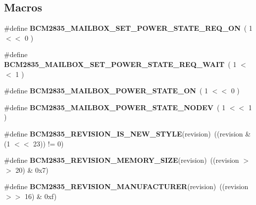 \subsection*{Macros}
\begin{DoxyCompactItemize}
\item 
\mbox{\label{group__raspberrypi__vc_ga726156a9056972f86bca2c0b709adf99}} 
\#define {\bfseries B\+C\+M2835\+\_\+\+M\+A\+I\+L\+B\+O\+X\+\_\+\+S\+E\+T\+\_\+\+P\+O\+W\+E\+R\+\_\+\+S\+T\+A\+T\+E\+\_\+\+R\+E\+Q\+\_\+\+ON}~( 1 $<$$<$ 0 )
\item 
\mbox{\label{group__raspberrypi__vc_ga9bc020dbaf9fcde6c191cfa50e85f363}} 
\#define {\bfseries B\+C\+M2835\+\_\+\+M\+A\+I\+L\+B\+O\+X\+\_\+\+S\+E\+T\+\_\+\+P\+O\+W\+E\+R\+\_\+\+S\+T\+A\+T\+E\+\_\+\+R\+E\+Q\+\_\+\+W\+A\+IT}~( 1 $<$$<$ 1 )
\item 
\mbox{\label{group__raspberrypi__vc_ga735623bc9ac7e9974fc88d27d602d33a}} 
\#define {\bfseries B\+C\+M2835\+\_\+\+M\+A\+I\+L\+B\+O\+X\+\_\+\+P\+O\+W\+E\+R\+\_\+\+S\+T\+A\+T\+E\+\_\+\+ON}~( 1 $<$$<$ 0 )
\item 
\mbox{\label{group__raspberrypi__vc_ga505cdb968bbf285e552bb575a5eeeaa5}} 
\#define {\bfseries B\+C\+M2835\+\_\+\+M\+A\+I\+L\+B\+O\+X\+\_\+\+P\+O\+W\+E\+R\+\_\+\+S\+T\+A\+T\+E\+\_\+\+N\+O\+D\+EV}~( 1 $<$$<$ 1 )
\item 
\mbox{\label{group__raspberrypi__vc_ga7c68b23a95cc0bf7c4079d1b6a31b81b}} 
\#define {\bfseries B\+C\+M2835\+\_\+\+R\+E\+V\+I\+S\+I\+O\+N\+\_\+\+I\+S\+\_\+\+N\+E\+W\+\_\+\+S\+T\+Y\+LE}(revision)~((revision \& (1 $<$$<$ 23)) != 0)
\item 
\mbox{\label{group__raspberrypi__vc_gaf74f55671c2df66f051d3e8058fd5558}} 
\#define {\bfseries B\+C\+M2835\+\_\+\+R\+E\+V\+I\+S\+I\+O\+N\+\_\+\+M\+E\+M\+O\+R\+Y\+\_\+\+S\+I\+ZE}(revision)~((revision $>$$>$ 20) \& 0x7)
\item 
\mbox{\label{group__raspberrypi__vc_ga2b7a5a4243f4e5336ea31b4b053f66f4}} 
\#define {\bfseries B\+C\+M2835\+\_\+\+R\+E\+V\+I\+S\+I\+O\+N\+\_\+\+M\+A\+N\+U\+F\+A\+C\+T\+U\+R\+ER}(revision)~((revision $>$$>$ 16) \& 0xf)
$$
\end{DoxyCompactItemize}

